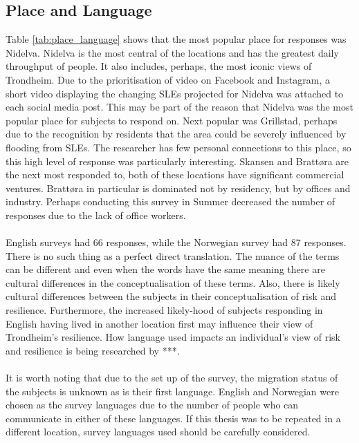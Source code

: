 \subsection{Place and Language}
Table \ref{tab:place_language} shows that the most popular place for responses was Nidelva. Nidelva is the most central of the locations and has the greatest daily throughput of people. It also includes, perhaps, the most iconic views of Trondheim. Due to the prioritisation of video on Facebook and Instagram, a short video displaying the changing SLEs projected for Nidelva was attached to each social media post. This may be part of the reason that Nidelva was the most popular place for subjects to respond on.  Next popular was Grillstad, perhaps due to the recognition by residents that the area could be severely influenced by flooding from SLEs. The researcher has few personal connections to this place, so this high level of response was particularly interesting. Skansen and Brattøra are the next most responded to, both of these locations have significant commercial ventures. Brattøra in particular is dominated not by residency, but by offices and industry. Perhaps conducting this survey in Summer decreased the number of responses due to the lack of office workers. 
\paragraph{}
English surveys had 66 responses, while the Norwegian survey had 87 responses. There is no such thing as a perfect direct translation. The nuance of the terms can be different and even when the words have the same meaning there are cultural differences in the conceptualisation of these terms. Also, there is likely cultural differences between the subjects in their conceptualisation of risk and resilience. Furthermore, the increased likely-hood of subjects responding in English having lived in another location first may influence their view of Trondheim's resilience. How language used impacts an individual's view of risk and resilience is being researched by ***.

\paragraph{}
It is worth noting that due to the set up of the survey, the migration status of the subjects is unknown as is their first language. English and Norwegian were chosen as the survey languages due to the number of people who can communicate in either of these languages. If this thesis was to be repeated in a different location, survey languages used should be carefully considered.


